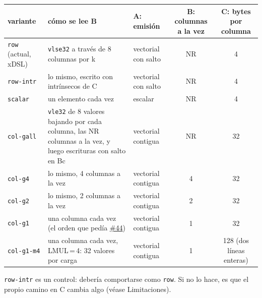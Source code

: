 \documentclass[10pt,a4paper]{article}
\newcommand{\iss}[1]{\href{https://github.com/JieGH/RVV_code_gen_via_MLIR_xDSL/issues/#1}{\##1}}
\begin{document}
\begin{center}\footnotesize\setlength{\tabcolsep}{4pt}
\begin{tabular}{@{}lp{5.4cm}lcc@{}}
\toprule
variante & cómo se lee B & A: emisión & B: columnas a la vez & C: bytes por columna \\
\midrule
\texttt{row} (actual, xDSL) & \texttt{vlse32} a través de 8 columnas por k & vectorial con salto & NR & 4 \\
\texttt{row-intr} & lo mismo, escrito con intrínsecos de C & vectorial con salto & NR & 4 \\
\texttt{scalar} & un elemento cada vez & escalar & NR & 4 \\
\texttt{col-gall} & \texttt{vle32} de 8 valores bajando por cada columna, las NR columnas a la vez, y luego escrituras con salto en Bc & vectorial contigua & NR & 32 \\
\texttt{col-g4} & lo mismo, 4 columnas a la vez & vectorial contigua & 4 & 32 \\
\texttt{col-g2} & lo mismo, 2 columnas a la vez & vectorial contigua & 2 & 32 \\
\texttt{col-g1} & una columna cada vez (el orden que pedía \iss{44}) & vectorial contigua & 1 & 32 \\
\texttt{col-g1-m4} & una columna cada vez, LMUL\,=\,4: 32 valores por carga & vectorial contigua & 1 & 128 (dos líneas enteras) \\
\bottomrule
\end{tabular}
\end{center}
\texttt{row-intr} es un control: debería comportarse como \texttt{row}. Si no lo hace, es que el propio camino en C cambia algo (véase
Limitaciones).
\end{document}
